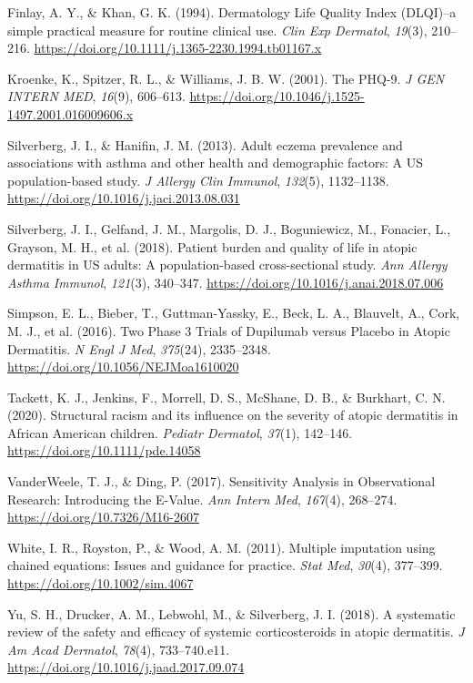 \documentclass[
]{agujournal2019}
\newlength{\cslhangindent}
\newenvironment{CSLReferences}[2] %
 {\begin{list}{}{%
  \setlength{\itemindent}{0pt}
  \setlength{\leftmargin}{0pt}
  \setlength{\parsep}{0pt}
  \ifodd #1
   \setlength{\leftmargin}{\cslhangindent}
   \setlength{\itemindent}{-1\cslhangindent}
  \fi
  \setlength{\itemsep}{#2\baselineskip}}}
 {\end{list}}
\begin{document}
\begin{CSLReferences}{1}{0}
Finlay, A. Y., \& Khan, G. K. (1994). Dermatology {Life} {Quality}
{Index} ({DLQI})--a simple practical measure for routine clinical use.
\emph{Clin Exp Dermatol}, \emph{19}(3), 210--216.
\url{https://doi.org/10.1111/j.1365-2230.1994.tb01167.x}

Kroenke, K., Spitzer, R. L., \& Williams, J. B. W. (2001). The {PHQ}-9.
\emph{J GEN INTERN MED}, \emph{16}(9), 606--613.
\url{https://doi.org/10.1046/j.1525-1497.2001.016009606.x}

Silverberg, J. I., \& Hanifin, J. M. (2013). Adult eczema prevalence and
associations with asthma and other health and demographic factors: A
{US} population-based study. \emph{J Allergy Clin Immunol},
\emph{132}(5), 1132--1138.
\url{https://doi.org/10.1016/j.jaci.2013.08.031}

Silverberg, J. I., Gelfand, J. M., Margolis, D. J., Boguniewicz, M.,
Fonacier, L., Grayson, M. H., et al. (2018). Patient burden and quality
of life in atopic dermatitis in {US} adults: {A} population-based
cross-sectional study. \emph{Ann Allergy Asthma Immunol}, \emph{121}(3),
340--347. \url{https://doi.org/10.1016/j.anai.2018.07.006}

Simpson, E. L., Bieber, T., Guttman-Yassky, E., Beck, L. A., Blauvelt,
A., Cork, M. J., et al. (2016). Two {Phase} 3 {Trials} of {Dupilumab}
versus {Placebo} in {Atopic} {Dermatitis}. \emph{N Engl J Med},
\emph{375}(24), 2335--2348. \url{https://doi.org/10.1056/NEJMoa1610020}

Tackett, K. J., Jenkins, F., Morrell, D. S., McShane, D. B., \&
Burkhart, C. N. (2020). Structural racism and its influence on the
severity of atopic dermatitis in {African} {American} children.
\emph{Pediatr Dermatol}, \emph{37}(1), 142--146.
\url{https://doi.org/10.1111/pde.14058}

VanderWeele, T. J., \& Ding, P. (2017). Sensitivity {Analysis} in
{Observational} {Research}: {Introducing} the {E}-{Value}. \emph{Ann
Intern Med}, \emph{167}(4), 268--274.
\url{https://doi.org/10.7326/M16-2607}

White, I. R., Royston, P., \& Wood, A. M. (2011). Multiple imputation
using chained equations: Issues and guidance for practice. \emph{Stat
Med}, \emph{30}(4), 377--399. \url{https://doi.org/10.1002/sim.4067}

Yu, S. H., Drucker, A. M., Lebwohl, M., \& Silverberg, J. I. (2018). A
systematic review of the safety and efficacy of systemic corticosteroids
in atopic dermatitis. \emph{J Am Acad Dermatol}, \emph{78}(4),
733--740.e11. \url{https://doi.org/10.1016/j.jaad.2017.09.074}

\end{CSLReferences}
\end{document}
